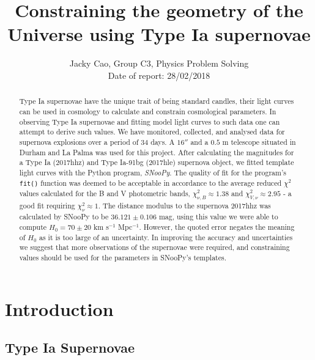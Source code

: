 \documentclass[twocolumn]{revtex4}
\begin{document}
\textheight=26.385cm

\title{Constraining the geometry of the Universe using Type Ia supernovae}
 
\author{Jacky Cao, Group C3, Physics Problem Solving \\ Date of report: 28/02/2018}

\begin{abstract}              
Type Ia supernovae have the unique trait of being standard candles, their light curves can be used in cosmology to calculate and constrain cosmological parameters. In observing Type Ia supernovae and fitting model light curves to such data one can attempt to derive such values. We have monitored, collected, and analysed data for supernova explosions over a period of 34 days. A $16''$ and a $0.5$ m telescope situated in Durham and La Palma was used for this project. After calculating the magnitudes for a Type Ia (2017hhz) and Type Ia-91bg (2017hle) supernova object, we fitted template light curves with the Python program, \textit{SNooPy}. The quality of fit for the program's \texttt{fit()} function was deemed to be acceptable in accordance to the average reduced $\chi^2$ values calculated for the B and V photometric bands, $\chi^2_{\nu,B} \approx 1.38$ and $\chi^2_{V,\nu} \approx 2.95$ - a good fit requiring $\chi^2_{\nu} \approx1$. The distance modulus to the supernova 2017hhz was calculated by SNooPy to be $36.121\pm0.106$ mag, using this value we were able to compute $H_0=70\pm20$ km s$^{-1}$ Mpc$^{-1}$. However, the quoted error negates the meaning of $H_0$ as it is too large of an uncertainty. In improving the accuracy and uncertainties we suggest that more observations of the supernovae were required, and constraining values should be used for the parameters in SNooPy's templates.
\end{abstract}

\maketitle

\vspace{-3ex}
\section{Introduction} 
\vspace{-2ex}
\subsection{Type Ia Supernovae}
\vspace{-2ex}
\end{document}
